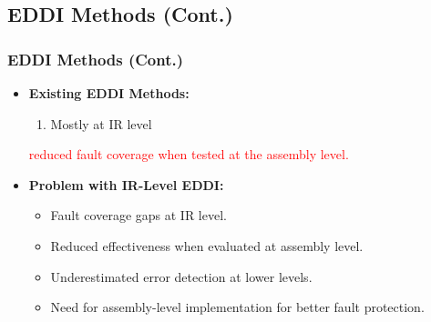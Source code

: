 \documentclass[
	12pt, %
]{beamer}
\begin{document}
\subsection{EDDI Methods (Cont.)}
\begin{frame}
	\frametitle{EDDI Methods (Cont.)}
	\begin{itemize}
		\item \textbf{Existing EDDI Methods:}
		\begin{enumerate}
			\item Mostly at IR level
		\end{enumerate}
		\textcolor{red}{reduced fault coverage when tested at the assembly level.}
		
		\item \textbf{Problem with IR-Level EDDI:}
		\begin{itemize}
			\item Fault coverage gaps at IR level.
			\item Reduced effectiveness when evaluated at assembly level.
			\item Underestimated error detection at lower levels.
			\item Need for assembly-level implementation for better fault protection.
		\end{itemize}
	\end{itemize}
\end{frame}
\end{document}
